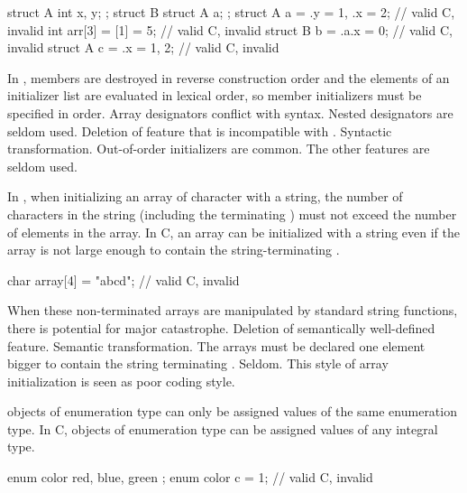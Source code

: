 \begin{example}
\begin{codeblock}
struct A { int x, y; };
struct B { struct A a; };
struct A a = {.y = 1, .x = 2};  // valid C, invalid \Cpp{}
int arr[3] = {[1] = 5};         // valid C, invalid \Cpp{}
struct B b = {.a.x = 0};        // valid C, invalid \Cpp{}
struct A c = {.x = 1, 2};       // valid C, invalid \Cpp{}
\end{codeblock}
\end{example}
\rationale
In \Cpp{}, members are destroyed in reverse construction order
and the elements of an initializer list are evaluated in lexical order,
so member initializers must be specified in order.
Array designators conflict with  syntax.
Nested designators are seldom used.
\effect
Deletion of feature that is incompatible with \Cpp{}.
\difficulty
Syntactic transformation.
\howwide
Out-of-order initializers are common.
The other features are seldom used.

\change
In \Cpp{}, when initializing an array of character with a string, the number of
characters in the string (including the terminating ) must not exceed the
number of elements in the array. In C, an array can be initialized with a string even if
the array is not large enough to contain the string-terminating .

\begin{example}
\begin{codeblock}
char array[4] = "abcd";         // valid C, invalid \Cpp{}
\end{codeblock}
\end{example}
\rationale
When these non-terminated arrays are manipulated by standard
string functions, there is potential for major catastrophe.
\effect
Deletion of semantically well-defined feature.
\difficulty
Semantic transformation.
The arrays must be declared one element bigger to contain the
string terminating .
\howwide
Seldom.
This style of array initialization is seen as poor coding style.

\change
\Cpp{} objects of enumeration type can only be assigned values of the same enumeration type.
In C, objects of enumeration type can be assigned values of any integral type.

\begin{example}
\begin{codeblock}
enum color { red, blue, green };
enum color c = 1;               // valid C, invalid \Cpp{}
\end{codeblock}
\end{example}


